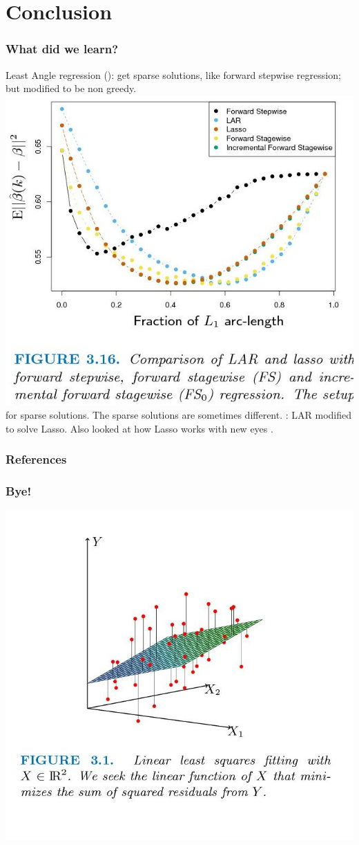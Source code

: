 \documentclass{beamer}
\begin{document}
\section{Conclusion}
\begin{frame}
\frametitle{What did we learn?}
\begin{itemize}
\pitem Least Angle regression (): get sparse solutions, like forward stepwise regression; but modified to be non greedy.
\includegraphics[scale=.1]{images/figures3-15.jpg}
\pitem {} for sparse solutions.
\pitem The sparse solutions are sometimes different.
\pitem {}: LAR modified to solve Lasso.  Also looked at how Lasso works with new eyes \red{$\bigstar \bigstar$}.
\end{itemize}
\end{frame}

\begin{frame}
\frametitle{References}


\end{frame}


\begin{frame}
\frametitle{Bye!}
\includegraphics[scale=.25]{images/figures3-0.jpg}
\pause \\
\end{frame}
\end{document}

